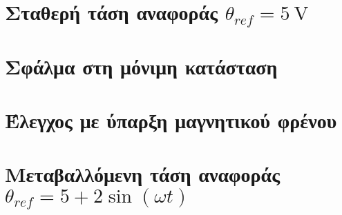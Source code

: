 \section[Σταθερή τάση αναφοράς]{Σταθερή τάση αναφοράς $\theta_{ref} = \SI{5}{\volt}$}
\section{Σφάλμα στη μόνιμη κατάσταση}
\section{Έλεγχος με ύπαρξη μαγνητικού φρένου}
\section[Μεταβαλλόμενη τάση αναφοράς]{Μεταβαλλόμενη τάση αναφοράς $\theta_{ref} = 5 + 2 \sin{\left(\omega t\right)}$}
